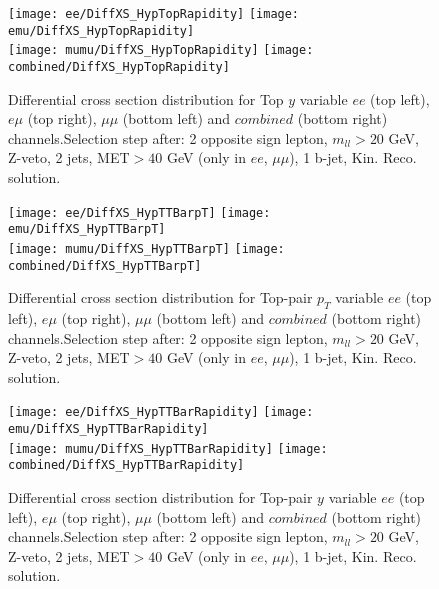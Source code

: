\documentclass[12pt, a4paper, titlepage]{article}
\begin{document}
\clearpage
\newpage

\begin{figure}
  \texttt{[image: ee/DiffXS\_HypTopRapidity]}
  \texttt{[image: emu/DiffXS\_HypTopRapidity]}\\
  \texttt{[image: mumu/DiffXS\_HypTopRapidity]}
  \texttt{[image: combined/DiffXS\_HypTopRapidity]}
\caption{Differential cross section distribution for  Top $y$ variable  $ee$ (top left), $e\mu$ (top right), $\mu\mu$ (bottom left) and $combined$ (bottom right) channels.\newline Selection step after: 2 opposite sign lepton, $m_{ll}>20$ GeV, Z-veto, 2 jets, MET$>40$ GeV (only in $ee$, $\mu\mu$), 1 b-jet, Kin. Reco. solution.}
\end{figure}

\clearpage
\newpage





\begin{figure}
  \texttt{[image: ee/DiffXS\_HypTTBarpT]}
  \texttt{[image: emu/DiffXS\_HypTTBarpT]}\\
  \texttt{[image: mumu/DiffXS\_HypTTBarpT]}
  \texttt{[image: combined/DiffXS\_HypTTBarpT]}
\caption{Differential cross section distribution for  Top-pair $p_T$ variable  $ee$ (top left), $e\mu$ (top right), $\mu\mu$ (bottom left) and $combined$ (bottom right) channels.\newline Selection step after: 2 opposite sign lepton, $m_{ll}>20$ GeV, Z-veto, 2 jets, MET$>40$ GeV (only in $ee$, $\mu\mu$), 1 b-jet, Kin. Reco. solution.}
\end{figure}

\clearpage
\newpage

\begin{figure}
  \texttt{[image: ee/DiffXS\_HypTTBarRapidity]}
  \texttt{[image: emu/DiffXS\_HypTTBarRapidity]}\\
  \texttt{[image: mumu/DiffXS\_HypTTBarRapidity]}
  \texttt{[image: combined/DiffXS\_HypTTBarRapidity]}
\caption{Differential cross section distribution for  Top-pair $y$ variable  $ee$ (top left), $e\mu$ (top right), $\mu\mu$ (bottom left) and $combined$ (bottom right) channels.\newline Selection step after: 2 opposite sign lepton, $m_{ll}>20$ GeV, Z-veto, 2 jets, MET$>40$ GeV (only in $ee$, $\mu\mu$), 1 b-jet, Kin. Reco. solution.}
\end{figure}
\end{document}
